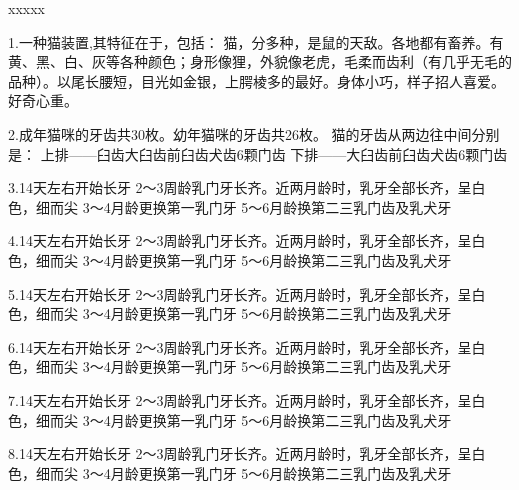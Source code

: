 \documentclass[hyperref]{ctexart}
\begin{document}
	xxxxx
	\thispagestyle{empty}
	\clearpage
{\large 	1.一种猫装置,其特征在于，包括：
	猫，分多种，是鼠的天敌。各地都有畜养。有黄、黑、白、灰等各种颜色；身形像狸，外貌像老虎，毛柔而齿利（有几乎无毛的品种）。以尾长腰短，目光如金银，上腭棱多的最好。身体小巧，样子招人喜爱。好奇心重。
	
	2.成年猫咪的牙齿共30枚。幼年猫咪的牙齿共26枚。
	猫的牙齿从两边往中间分别是：
	上排——臼齿大臼齿前臼齿犬齿6颗门齿
	下排——大臼齿前臼齿犬齿6颗门齿
	
	3.14天左右开始长牙
	2～3周龄乳门牙长齐。近两月龄时，乳牙全部长齐，呈白色，细而尖
	3～4月龄更换第一乳门牙
	5～6月龄换第二三乳门齿及乳犬牙
	
	4.14天左右开始长牙
	2～3周龄乳门牙长齐。近两月龄时，乳牙全部长齐，呈白色，细而尖
	3～4月龄更换第一乳门牙
	5～6月龄换第二三乳门齿及乳犬牙
	
	5.14天左右开始长牙
	2～3周龄乳门牙长齐。近两月龄时，乳牙全部长齐，呈白色，细而尖
	3～4月龄更换第一乳门牙
	5～6月龄换第二三乳门齿及乳犬牙
	
	6.14天左右开始长牙
	2～3周龄乳门牙长齐。近两月龄时，乳牙全部长齐，呈白色，细而尖
	3～4月龄更换第一乳门牙
	5～6月龄换第二三乳门齿及乳犬牙
	
	7.14天左右开始长牙
	2～3周龄乳门牙长齐。近两月龄时，乳牙全部长齐，呈白色，细而尖
	3～4月龄更换第一乳门牙
	5～6月龄换第二三乳门齿及乳犬牙
	
	8.14天左右开始长牙
	2～3周龄乳门牙长齐。近两月龄时，乳牙全部长齐，呈白色，细而尖
	3～4月龄更换第一乳门牙
	5～6月龄换第二三乳门齿及乳犬牙	}
\end{document}

